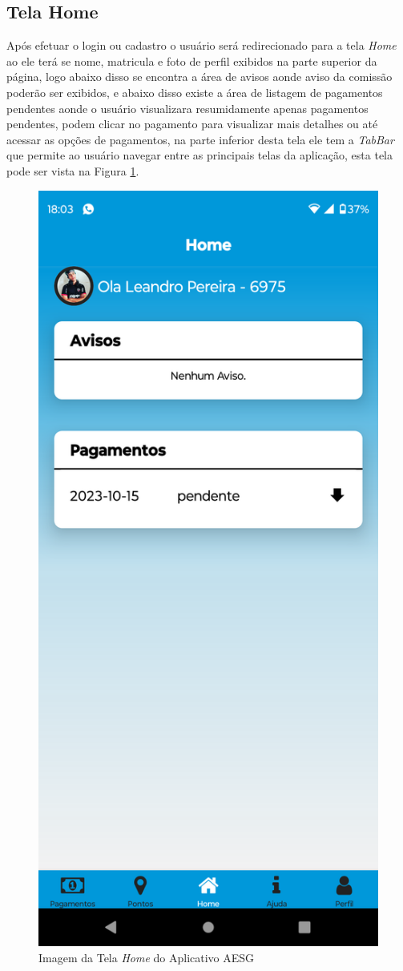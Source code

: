 \documentclass[
    12pt,                   %
    openright,              %
    oneside,                %
    a4paper,                %
    sumario=tradicional,    %
    english,                %
    brazil,                 %
    ]{abntex2}
\begin{document}
        \subsection{Tela Home}
            Após efetuar o login ou cadastro o usuário será redirecionado para a tela \textit{Home} ao ele terá se nome, matricula e foto de perfil exibidos na parte superior da página, logo abaixo disso se encontra a área de avisos aonde aviso da comissão poderão ser exibidos, e abaixo disso existe a área de listagem de pagamentos pendentes aonde o usuário visualizara resumidamente apenas pagamentos pendentes, podem clicar no pagamento para visualizar mais detalhes ou até acessar as opções de pagamentos, na parte inferior desta tela ele tem a \textit{TabBar} que permite ao usuário navegar entre as principais telas da aplicação, esta tela pode ser vista na Figura \ref{fig:AppTelaHome}.

            \begin{figure}[!h]
                \begin{center}
                \centering
                \includegraphics[width=0.4\linewidth]{Imagens/App Images User/AUHome.png}
                \end{center}
                \caption[Imagem da Tela \textit{Home} do Aplicativo AESG]{ 
                Imagem da Tela \textit{Home} do Aplicativo AESG}
                \label{fig:AppTelaHome}
            \end{figure}
\end{document}
